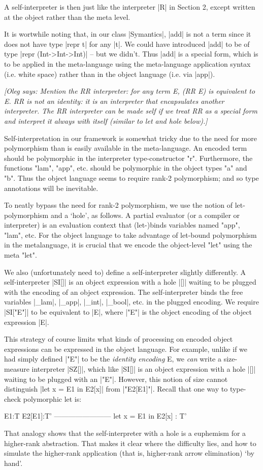 \documentclass[preprint]{sigplanconf}
\newcommand{\oleg}[1]{{\it [Oleg says: #1]}}
\begin{document}
A self-interpreter is then just like the interpreter
|R| in Section 2, except written at the object rather than the meta level.

It is wortwhile noting that, in our class |Symantics|, |add|
is not a term since it does not have type |repr t| for any |t|. We could
have introduced |add| to be of type |repr (Int->Int->Int)| -- but we
didn't. Thus |add| is a special form, which is to be applied in the
meta-language using the meta-language application syntax (i.e. white
space) rather than in the object language (i.e. via |app|). 

\oleg{Mention the RR interpreter: for any term E, (RR E) is equivalent to E.
RR is not an identity: it is an interpreter that encapsulates another
interpreter. The RR interpreter can be made self if we treat RR as a
special form and interpret it always with itself (similar to let and
hole below).}

Self-interpretation in our framework is somewhat
tricky due to the need for more polymorphism than is easily available
in the meta-language.  An encoded term should
be polymorphic in the interpreter type-constructor "r".  Furthermore, the
functions "lam", "app", etc. should be polymorphic in the object
types "a" and "b".  Thus the object language seems to require rank-2
polymorphism; and so type annotations will be inevitable.

To neatly bypass the need for rank-2 polymorphism, we use the notion
of let-polymorphism and a `hole', as follows.  A partial evaluator (or
a compiler or interpreter) is an evaluation context that (let-)binds
variables named "app", "lam", etc.  For the object language to
take advantage of let-bound polymorphism in the metalanguage, it
is crucial that we encode the object-level "let" using the meta "let".  

We also (unfortunately need to) define a self-interpreter slightly
differently.  A self-interpreter |SI[]| is an object expression with a
hole |[]| waiting to be plugged with the encoding of an object expression.
The self-interpreter binds the free variables |_lam|, |_app|, |_int|, |_bool|,
etc. in the plugged encoding.  We require |SI["E"]| to be equivalent to |E|,
where |"E"| is the object encoding of the object expression |E|.

This strategy of course limits what kinds of processing on encoded
object expressions can be expressed in the object language.  For
example, unlike if we had simply defined |"E"| to be the \emph{identity
encoding} E, we \emph{can} write a size-measure interpreter |SZ[]|, 
which like |SI[]| is
an object expression with a hole |[]| waiting to be plugged with 
an |"E"|.
However, this notion of size cannot distinguish |let x = E1 in E2[x]|
from |"E2[E1]"|.  Recall that one way to type-check polymorphic let is:
\begin{code}
        E1:T    E2[E1]:T'
    ------------------------
    let x = E1 in E2[x] : T'
\end{code}
That analogy shows that the self-interpreter with a hole is a
euphemism for a higher-rank abstraction. That makes it clear where
the difficulty lies, and how to simulate the higher-rank application
(that is, higher-rank arrow elimination) `by hand'.
\end{document}
